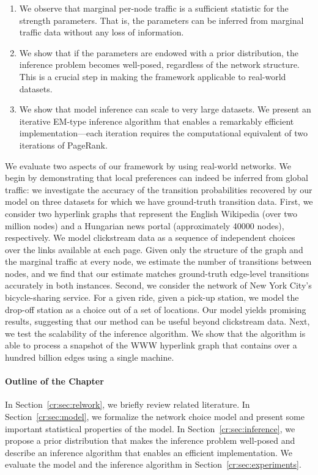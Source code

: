 \begin{enumerate}
\item We observe that marginal per-node traffic is a sufficient statistic for the strength parameters.
That is, the parameters can be inferred from marginal traffic data without any loss of information.

\item We show that if the parameters are endowed with a prior distribution, the inference problem becomes well-posed, regardless of the network structure.
This is a crucial step in making the framework applicable to real-world datasets.

\item We show that model inference can scale to very large datasets.
We present an iterative EM-type inference algorithm that enables a remarkably efficient implementation---each iteration requires the computational equivalent of two iterations of PageRank.
\end{enumerate}


We evaluate two aspects of our framework by using real-world networks.
We begin by demonstrating that local preferences can indeed be inferred from global traffic: we investigate the accuracy of the transition probabilities recovered by our model on three datasets for which we have ground-truth transition data.
First, we consider two hyperlink graphs that represent the English Wikipedia (over two million nodes) and a Hungarian news portal (approximately \num{40000} nodes), respectively.
We model clickstream data as a sequence of independent choices over the links available at each page.
Given only the structure of the graph and the marginal traffic at every node, we estimate the number of transitions between nodes, and we find that our estimate matches ground-truth edge-level transitions accurately in both instances.
Second, we consider the network of New York City's bicycle-sharing service.
For a given ride, given a pick-up station, we model the drop-off station as a choice out of a set of locations.
Our model yields promising results, suggesting that our method can be useful beyond clickstream data.
Next, we test the scalability of the inference algorithm.
We show that the algorithm is able to process a snapshot of the WWW hyperlink graph that contains over a hundred billion edges using a single machine.

\paragraph{Outline of the Chapter}
In Section~\ref{cr:sec:relwork}, we briefly review related literature.
In Section~\ref{cr:sec:model}, we formalize the network choice model and present some important statistical properties of the model.
In Section~\ref{cr:sec:inference}, we propose a prior distribution that makes the inference problem well-posed and describe an inference algorithm that enables an efficient implementation.
We evaluate the model and the inference algorithm in Section~\ref{cr:sec:experiments}.

